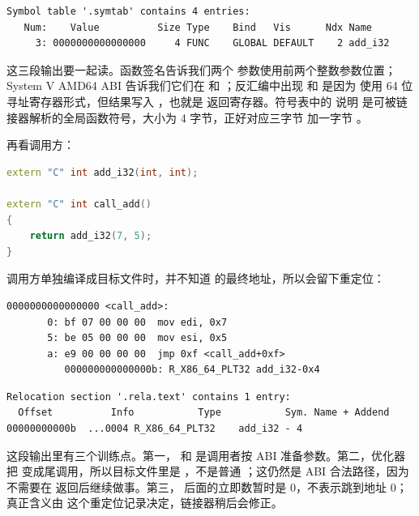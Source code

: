 \begin{lstlisting}[numbers=none,caption={readelf 符号表中的函数记录}]
Symbol table '.symtab' contains 4 entries:
   Num:    Value          Size Type    Bind   Vis      Ndx Name
     3: 0000000000000000     4 FUNC    GLOBAL DEFAULT    2 add_i32
\end{lstlisting}

这三段输出要一起读。函数签名告诉我们两个  参数使用前两个整数参数位置；System V AMD64 ABI 告诉我们它们在  和 ；反汇编中出现  和  是因为  使用 64 位寻址寄存器形式，但结果写入 ，也就是  返回寄存器。符号表中的  说明  是可被链接器解析的全局函数符号，大小为 4 字节，正好对应三字节  加一字节 。

再看调用方：

\begin{lstlisting}[language=C++,caption={调用方翻译单元}]
extern "C" int add_i32(int, int);

extern "C" int call_add()
{
    return add_i32(7, 5);
}
\end{lstlisting}

调用方单独编译成目标文件时，并不知道  的最终地址，所以会留下重定位：

\begin{lstlisting}[numbers=none,caption={调用方目标文件的反汇编和重定位}]
0000000000000000 <call_add>:
       0: bf 07 00 00 00  mov edi, 0x7
       5: be 05 00 00 00  mov esi, 0x5
       a: e9 00 00 00 00  jmp 0xf <call_add+0xf>
          000000000000000b: R_X86_64_PLT32 add_i32-0x4
\end{lstlisting}

\begin{lstlisting}[numbers=none,caption={readelf -r 看到的 relocation entry}]
Relocation section '.rela.text' contains 1 entry:
  Offset          Info           Type           Sym. Name + Addend
00000000000b  ...0004 R_X86_64_PLT32    add_i32 - 4
\end{lstlisting}

这段输出里有三个训练点。第一， 和  是调用者按 ABI 准备参数。第二，优化器把  变成尾调用，所以目标文件里是 ，不是普通 ；这仍然是 ABI 合法路径，因为  不需要在  返回后继续做事。第三， 后面的立即数暂时是 0，不表示跳到地址 0；真正含义由  这个重定位记录决定，链接器稍后会修正。

